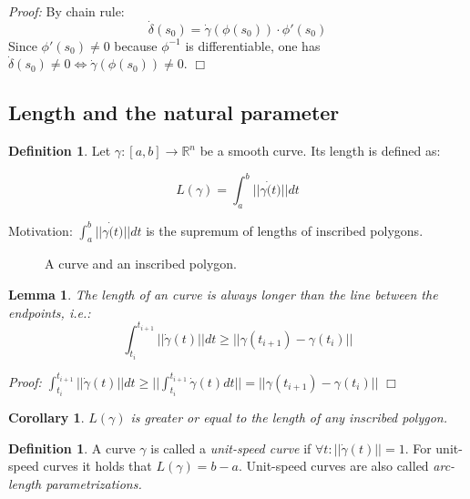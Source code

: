 \documentclass[a4paper,11pt,notitlepage,fullpage]{paper}
\theoremstyle{plain}
\newtheorem{lem}[thm]{Lemma}
\newtheorem{col}[thm]{Corollary}
\theoremstyle{definition}
\newtheorem{defn}[thm]{Definition} %
\begin{document}
\emph{Proof:} By chain rule: 
\begin{equation*}
\dot\delta(s_0) = \dot\gamma(\phi(s_0)) \cdot \phi'(s_0)
\end{equation*}
Since $\phi'(s_0) \neq 0$ because $\phi^{-1}$ is differentiable, one has $\dot\delta(s_0) \neq 0 \Leftrightarrow \dot\gamma(\phi(s_0)) \neq 0$. \hfill $\Box$



\subsection{Length and the natural parameter}

\begin{defn}
Let $\gamma: [a,b] \to \mathbb R^n$ be a smooth curve. Its length is defined as:

\begin{equation*}
L(\gamma) = \int_a^b ||\gamma\dot(t)|| dt
\end{equation*}
\end{defn}

Motivation: $\int_a^b ||\gamma\dot(t)|| dt $ is the supremum of lengths of inscribed polygons.

\begin{figure}[H]
\centering
\def\svgwidth{0.7\textwidth}

\caption{A curve and an inscribed polygon.}
\label{fig:inscribed-polygon}
\end{figure}


\begin{lem}
The length of an curve is always longer than the line between the endpoints, i.e.:
\begin{equation*}
\int_{t_i}^{t_{i+1}} ||\dot\gamma(t)|| dt \geq ||\gamma(t_{i+1}) - \gamma(t_i)||
\end{equation*}
\end{lem}
\emph{Proof:} $\int_{t_i}^{t_{i+1}} ||\dot\gamma(t)|| dt \geq ||\int_{t_i}^{t_{i+1}} \dot\gamma(t) dt|| =  ||\gamma(t_{i+1}) - \gamma(t_i)||$ \hfill $\Box$

\begin{col}
$L(\gamma)$ is greater or equal to the length of any inscribed polygon.
\end{col}


\begin{defn}
A curve $\gamma$ is called a \emph{unit-speed curve} if $\forall t : ||\dot\gamma(t)|| = 1$. For unit-speed curves it holds that $L(\gamma) = b-a$. Unit-speed curves are also called \emph{arc-length parametrizations.}
\end{defn}
\end{document}
